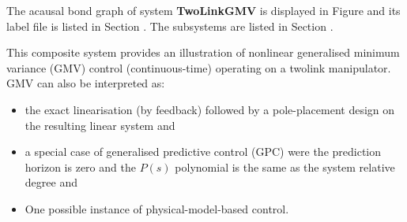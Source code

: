 

   The acausal bond graph of system \textbf{TwoLinkGMV} is
   displayed in Figure  and its label
   file is listed in Section .
   The subsystems are listed in Section .

This composite system provides an illustration of nonlinear
generalised minimum variance (GMV) control (continuous-time) operating on a
twolink manipulator. GMV can also be interpreted as:
\begin{itemize}
\item the exact linearisation (by feedback) followed by a
  pole-placement design on the resulting linear system and
\item a special case of generalised predictive control (GPC) were the
  prediction horizon is zero and the $P(s)$ polynomial is the same as
  the system relative degree and
\item One possible instance of physical-model-based control.
\end{itemize}

